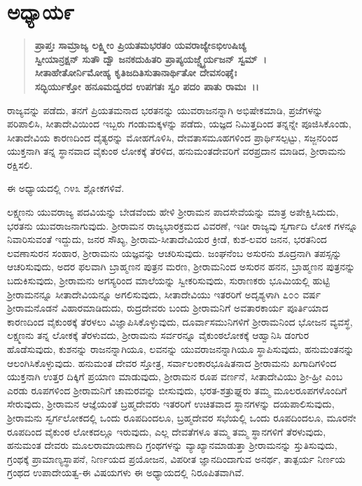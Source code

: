 \section*{ಅಧ್ಯಾಯ\enginline{-}೯}

\begin{verse}
\textbf{ಪ್ರಾಪ್ತಃ ಸಾಮ್ರಾಜ್ಯ ಲಕ್ಷ್ಮೀಂ ಪ್ರಿಯತಮಭರತಂ ಯವರಾಜ್ಯೇಽಭಿಉಷಿಚ್ಯ}\\\textbf{ಸ್ವೀಯಾನ್ರಕ್ಷನ್ ಸುತೌ ದ್ವೌ ಜನಕದುಹಿತರಿ ಪ್ರಾಪ್ಯಯಜ್ಚ್ನೈರ್ಯಜನ್ ಸ್ವಮ್~।}\\\textbf{ ಸೀತಾಹೇತೋರ್ನಿಮೋಹ್ಯ ಕೃತಿಜದಿತಿಸುತಾನಾರ್ಥಿತೋ ದೇವಸಂಘೈಃ }\\\textbf{ಸದ್ಭಿರ್ಯುಕ್ತೋ ಹನೂಮದ್ವರದ ಉಪಗತಃ ಸ್ವಂ ಪದಂ ಪಾತು ರಾಮಃ~।।}
\end{verse}

ರಾಜ್ಯವನ್ನು ಪಡೆದು, ತನಗೆ ಪ್ರಿಯತಮನಾದ ಭರತನನ್ನು ಯುವರಾಜನನ್ನಾಗಿ ಅಭಿಷೇಕಮಾಡಿ, ಪ್ರಜೆಗಳನ್ನು ಪರಿಪಾಲಿಸಿ, ಸೀತಾದೇವಿಯಿಂದ ಇಬ್ಬರು ಗಂಡುಮಕ್ಕಳನ್ನು ಪಡೆದು, ಯಜ್ಞದ ನಿಮಿತ್ತದಿಂದ ತನ್ನನ್ನೇ ಪೂಜಿಸಿಕೊಂಡು, ಸೀತಾದೇವಿಯ ಕಾರಣದಿಂದ ದೈತ್ಯರನ್ನು ಮೋಹಗೊಳಿಸಿ, ದೇವತಾಸಮೂಹಗಳಿಂದ ಪ್ರಾರ್ಥಿಸಲ್ಪಟ್ಟು, ಸಜ್ಜನರಿಂದ ಯುಕ್ತನಾಗಿ ತನ್ನ ಸ್ಥಾನವಾದ ವೈಕುಂಠ ಲೋಕಕ್ಕೆ ತೆರಳಿದ, ಹನುಮಂತದೇವರಿಗೆ ವರಪ್ರದಾನ ಮಾಡಿದ, ಶ‍್ರೀರಾಮನು ರಕ್ಷಿಸಲಿ.

ಈ ಅಧ್ಯಾಯದಲ್ಲಿ ೧೪೩ ಶ್ಲೋಕಗಳಿವೆ.

ಲಕ್ಷ್ಮಣನು ಯುವರಾಜ್ಯ ಪದವಿಯನ್ನು ಬೇಡವೆಂದು ಹೇಳಿ ಶ‍್ರೀರಾಮನ ಪಾದಸೇವೆಯನ್ನು ಮಾತ್ರ ಅಪೇಕ್ಷಿಸಿದುದು, ಭರತನು ಯುವರಾಜನಾಗುವುದು. ಶ‍್ರೀರಾಮನ ರಾಜ್ಯಭಾರಕ್ರಮದ ವಿವರಣೆ, ಇಡೀ ರಾಜ್ಯವು ಸ್ವರ್ಗಾದಿ ಲೋಕ ಗಳನ್ನೂ ನಿವಾರಿಸುವಂತೆ ಇದ್ದುದು, ಜನರ ಸೌಖ್ಯ, ಶ‍್ರೀರಾಮ-ಸೀತಾದೇವಿಯರ ಕ್ರೀಡೆ, ಕುಶ-ಲವರ ಜನನ, ಭರತನಿಂದ ಲವಣಾಸುರನ ಸಂಹಾರ, ಶ‍್ರೀರಾಮನು ಯಜ್ಞವನ್ನು ಆಚರಿಸುವುದು. ಜಂಘನೆಂಬ ಅಸುರನು ಶೂದ್ರನಾಗಿ ತಪಸ್ಸನ್ನು ಆಚರಿಸುವುದು, ಅದರ ಫಲವಾಗಿ ಬ್ರಾಹ್ಮಣನ ಪುತ್ರನ ಮರಣ, ಶ‍್ರೀರಾಮನಿಂದ ಅಸುರನ ಹನನ, ಬ್ರಾಹ್ಮಣನ ಪುತ್ರನನ್ನು ಬದುಕಿಸುವುದು, ಶ‍್ರೀರಾಮನು ಅಗಸ್ಯರಿಂದ ಮಾಲೆಯನ್ನು ಸ್ವೀಕರಿಸುವುದು, ಸುರಾಣಕರು ಭೂಮಿಯಲ್ಲಿ ಹುಟ್ಟಿ ಶ‍್ರೀರಾಮನನ್ನೂ ಸೀತಾದೇವಿಯನ್ನೂ ಅಗಲಿಸುವುದು, ಸೀತಾದೇವಿಯು ಇತರರಿಗೆ ಅದೃಶ್ಯಳಾಗಿ ೭೦೦ ವರ್ಷ ಶ‍್ರೀರಾಮನೊಡನೆ ವಿಹಾರಮಾಡಿದುದು, ರುದ್ರದೇವರು ಬಂದು ಶ‍್ರೀರಾಮನಿಗೆ ಅವತಾರಕಾರ್ಯ ಪೂರ್ತಿಯಾದ ಕಾರಣದಿಂದ ವೈಕುಂಠಕ್ಕೆ ತೆರಳಲು ವಿಜ್ಞಾಪಿಸಿಕೊಳ್ಳುವುದು, ದೂರ್ವಾಸಮುನಿಗಳಿಗೆ ಶ‍್ರೀರಾಮನಿಂದ ಭೋಜನ ವ್ಯವಸ್ಥೆ, ಲಕ್ಷ್ಮಣನು ತನ್ನ ಲೋಕಕ್ಕೆ ತೆರಳುವದು, ಶ‍್ರೀರಾಮನು ಸರ್ವರನ್ನೂ ವೈಕುಂಠಲೋಕಕ್ಕೆ ಆಹ್ವಾನಿಸಿ ಡಂಗುರ ಹೊಡೆಸುವುದು, ಕುಶನನ್ನು ರಾಜನನ್ನಾಗಿಯೂ, ಲವನನ್ನು ಯುವರಾಜನನ್ನಾಗಿಯೂ ಸ್ಥಾಪಿಸುವುದು, ಹನುಮಂತನನ್ನು ಆಲಂಗಿಸಿಕೊಳ್ಳುವುದು. ಹನುಮಂತ ದೇವರ ಸ್ತೋತ್ರ, ಸರ್ವಾಲಂಕಾರಭೂಷಿತನಾದ ಶ‍್ರೀರಾಮನು ಖಗಾದಿಗಳಿಂದ ಯುಕ್ತನಾಗಿ ಉತ್ತರ ದಿಕ್ಕಿಗೆ ಪ್ರಯಾಣ ಮಾಡುವುದು, ಶ‍್ರೀರಾಮನ ರೂಪ ವರ್ಣನೆ, ಸೀತಾದೇವಿಯು ಶ‍್ರೀ-ಹ್ರೀ ಎಂಬ ಎರಡು ರೂಪಗಳಿಂದ ಶ‍್ರೀರಾಮನಿಗೆ ಚಾಮರವನ್ನು ಬೀಸುವುದು, ಭರತ-ಶತ್ರುಘ್ನರು ತಮ್ಮ ಮೂಲರೂಪಗಳೊಂದಿಗೆ ಸೇರುವುದು, ಶ‍್ರೀರಾಮನ ಆಜ್ಞೆಯಂತೆ ಬ್ರಹ್ಮದೇವರು ಇತರರಿಗೆ ಉಚಿತವಾದ ಸ್ಥಾನಗಳನ್ನು ದಯಪಾಲಿಸುವುದು, ಶ‍್ರೀರಾಮನು ಸ್ವರ್ಗಲೋಕದಲ್ಲಿ ಒಂದು ರೂಪದಿಂದಲೂ, ಬ್ರಹ್ಮದೇವರ ಸಭೆಯಲ್ಲಿ ಒಂದು ರೂಪದಿಂದಲೂ, ಮೂರನೇ ರೂಪದಿಂದ ವೈಕುಂಠ ಲೋಕದಲ್ಲೂ ಇರುವುದು, ಎಲ್ಲ ದೇವತೆಗಳೂ ತಮ್ಮ ತಮ್ಮ ಸ್ಥಾನಗಳಿಗೆ ತೆರಳುವುದು, ಹನುಮಂತ ದೇವರು ಮೂಲರಾಮಾಯಣಾದಿ ಗ್ರಂಥಗಳನ್ನು ವ್ಯಾಖ್ಯಾನಮಾಡುತ್ತಾ ಶ‍್ರೀರಾಮನನ್ನು ಸ್ತುತಿಸುವುದು, ಗ್ರಂಥಕ್ಕೆ ಪ್ರಾಮಾಣ್ಯಸ್ಥಾಪನೆ, ನಿರ್ಣಯದ ಪ್ರಯೋಜನ, ವಿಪರೀತ ಜ್ಞಾನದಿಂದಾಗುವ ಅನರ್ಥ, ತಾತ್ಪರ್ಯ ನಿರ್ಣಯ ಗ್ರಂಥದ ಉಪಾದೇಯತ್ವ-ಈ ವಿಷಯಗಳು ಈ ಅಧ್ಯಾಯದಲ್ಲಿ ನಿರೂಪಿತವಾಗಿವೆ.


